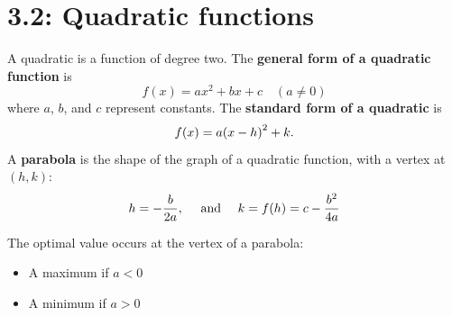 \documentclass[../mathNotesPreamble]{subfiles}
\providecommand{\relscalefact}{1.4}
\begin{document}
\relscale{\relscalefact}
  \section{3.2: Quadratic functions}

  \begin{defn*}
    A quadratic is a function of degree two. The \textbf{general form of a quadratic function} is
      \[f(x)=ax^2+bx+c \quad (a\neq 0)\]
    where $a$, $b$, and $c$ represent constants. The \textbf{standard form of a quadratic} is
      \[f(x)=a{\left(x-h\right)}^2+k.\]
    A \textbf{parabola} is the shape of the graph of a quadratic function, with a vertex at $(h,k)$:
      \[h=-\dfrac{b}{2a}, \quad \textnormal{ and }\quad k=f{\left(h\right)}=c-\dfrac{b^2}{4a}\]

    \TabPositions{50mm}
    The optimal value occurs at the vertex of a parabola:
    \begin{itemize}
      \item A maximum if $a<0$
        \tab{}
      \item A minimum if $a>0$
        \tab{}
    \end{itemize}
  \end{defn*}
\end{document}
